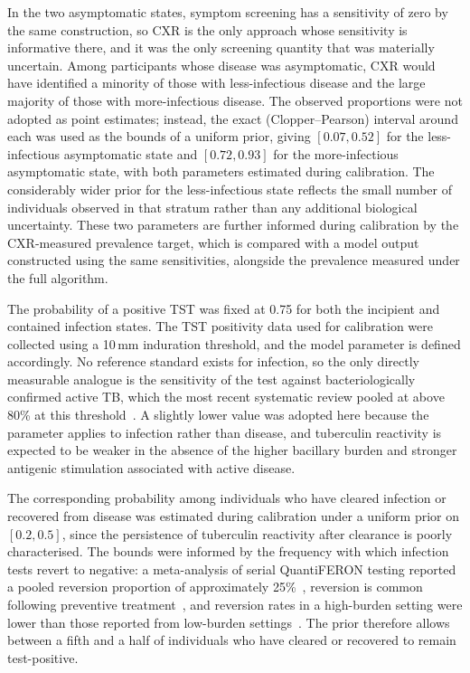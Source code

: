In the two asymptomatic states, symptom screening has a sensitivity of zero by the same construction, so CXR is the only approach whose sensitivity is informative there, and it was the only screening quantity that was materially uncertain. Among participants whose disease was asymptomatic, CXR would have identified a minority of those with less-infectious disease and the large majority of those with more-infectious disease. The observed proportions were not adopted as point estimates; instead, the exact (Clopper--Pearson) interval around each was used as the bounds of a uniform prior, giving \([0.07, 0.52]\) for the less-infectious asymptomatic state and \([0.72, 0.93]\) for the more-infectious asymptomatic state, with both parameters estimated during calibration. The considerably wider prior for the less-infectious state reflects the small number of individuals observed in that stratum rather than any additional biological uncertainty. These two parameters are further informed during calibration by the CXR-measured prevalence target, which is compared with a model output constructed using the same sensitivities, alongside the prevalence measured under the full algorithm.

The probability of a positive TST was fixed at 0.75 for both the incipient and contained infection states. The TST positivity data used for calibration were collected using a 10\,mm induration threshold, and the model parameter is defined accordingly. No reference standard exists for infection, so the only directly measurable analogue is the sensitivity of the test against bacteriologically confirmed active TB, which the most recent systematic review pooled at above 80\% at this threshold~\cite{jonas2023}. A slightly lower value was adopted here because the parameter applies to infection rather than disease, and tuberculin reactivity is expected to be weaker in the absence of the higher bacillary burden and stronger antigenic stimulation associated with active disease.

The corresponding probability among individuals who have cleared infection or recovered from disease was estimated during calibration under a uniform prior on \([0.2, 0.5]\), since the persistence of tuberculin reactivity after clearance is poorly characterised. The bounds were informed by the frequency with which infection tests revert to negative: a meta-analysis of serial QuantiFERON testing reported a pooled reversion proportion of approximately 25\%~\cite{zhang2018}, reversion is common following preventive treatment~\cite{johnson2014}, and reversion rates in a high-burden setting were lower than those reported from low-burden settings~\cite{andrews2015}. The prior therefore allows between a fifth and a half of individuals who have cleared or recovered to remain test-positive.


